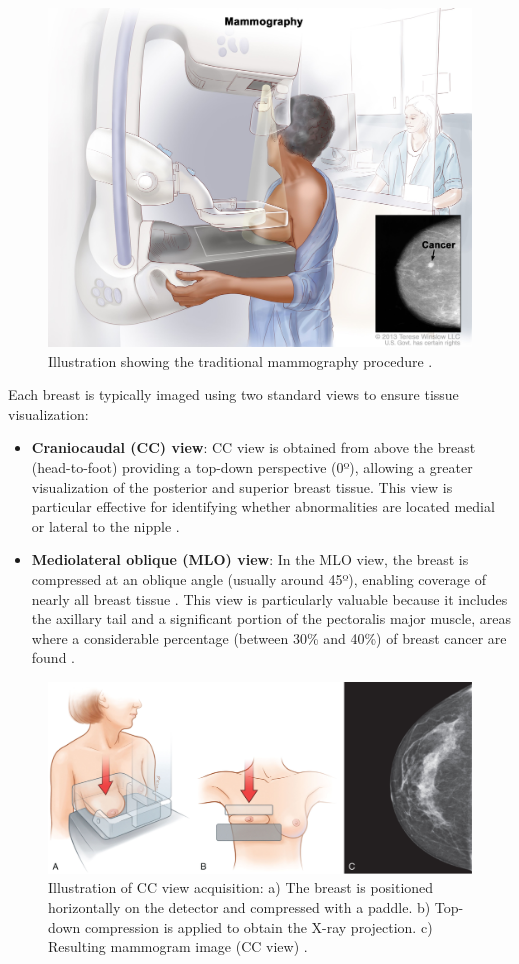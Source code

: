 \documentclass[a4paper,10pt]{book}
\begin{document}
\begin{figure}[h!]
    \centering
    \includegraphics[width=0.45\linewidth]{reports//assets/mammography.jpg}
    \caption[Traditional mammography procedure]{Illustration showing the traditional mammography procedure \cite{nihDefinitionMammogramNCI2011}.}
    \label{fig:mammography}
\end{figure}


Each breast is typically imaged using two standard views to ensure tissue visualization:

\begin{itemize}
    \item \textbf{Craniocaudal (CC) view}: CC view is obtained from above the breast (head-to-foot) providing a top-down perspective (0º), allowing a greater visualization of the posterior and superior breast tissue. This view is particular effective for identifying whether abnormalities are located medial or lateral to the nipple \cite{noauthor_guide_nodate}.
    \item \textbf{Mediolateral oblique (MLO) view}: In the MLO view, the breast is compressed at an oblique angle (usually around 45º), enabling coverage of nearly all breast tissue \cite{noauthor_guide_nodate}. This view is particularly valuable because it includes the axillary tail and a significant portion of the pectoralis major muscle, areas where a considerable percentage (between 30\% and 40\%) of breast cancer are found \cite{aljarrah_trends_2014, noauthor_breast_2015}.
\end{itemize}



\begin{figure}[h!]
    \centering
    \includegraphics[width=0.6\linewidth]{reports//assets/cc_view.jpg}
    \caption[CC view acquisition procedure]{Illustration of CC view acquisition: a) The breast is positioned horizontally on the detector and compressed with a paddle. b) Top-down compression is applied to obtain the X-ray projection. 
    c) Resulting mammogram image (CC view) \cite{imaging_introduction_2022}. }
    \label{fig:cc_view}
\end{figure}
\end{document}
